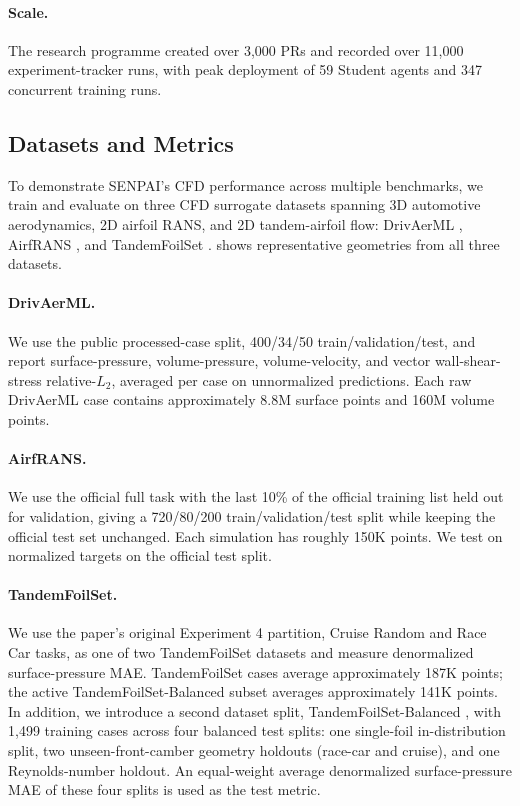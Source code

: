 \documentclass{article}
\begin{document}
\paragraph{Scale.}
The research programme created over 3,000 PRs and recorded over 11,000 experiment-tracker runs, with peak deployment of 59 Student agents and 347 concurrent training runs.

\subsection{Datasets and Metrics}

To demonstrate SENPAI's CFD performance across multiple benchmarks, we train and evaluate on three CFD surrogate datasets spanning 3D automotive aerodynamics, 2D airfoil RANS, and 2D tandem-airfoil flow: DrivAerML \citep{ashton2024drivaerml}, AirfRANS \citep{bonnet2022airfrans}, and TandemFoilSet \citep{lim2026tandemfoilset}.  shows representative geometries from all three datasets.

\paragraph{DrivAerML.}
We use the public processed-case split, 400/34/50 train/validation/test, and report surface-pressure, volume-pressure, volume-velocity, and vector wall-shear-stress relative-$L_2$, averaged per case on unnormalized predictions. Each raw DrivAerML case contains approximately 8.8M surface points and 160M volume points.

\paragraph{AirfRANS.}
We use the official full task with the last 10\% of the official training list held out for validation, giving a 720/80/200 train/validation/test split while keeping the official test set unchanged. Each simulation has roughly 150K points. We test on normalized targets on the official test split.

\paragraph{TandemFoilSet.}
We use the paper's original Experiment 4 partition, Cruise Random and Race Car tasks, as one of two TandemFoilSet datasets and measure denormalized surface-pressure MAE. TandemFoilSet cases average approximately 187K points; the active TandemFoilSet-Balanced subset averages approximately 141K points. In addition, we introduce a second dataset split, TandemFoilSet-Balanced \citep{mcguire2026tandemfoilsetbalanced}, with 1,499 training cases across four balanced test splits: one single-foil in-distribution split, two unseen-front-camber geometry holdouts (race-car and cruise), and one Reynolds-number holdout. An equal-weight average denormalized surface-pressure MAE of these four splits is used as the test metric.
\end{document}
